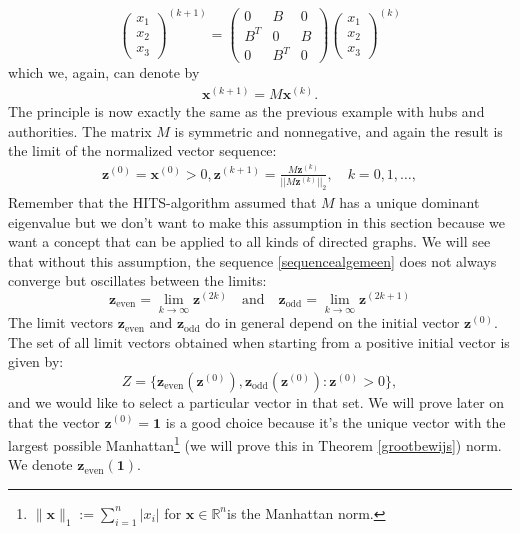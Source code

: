 \documentclass[a4paper,11pt]{report}
\newcommand{\R}{{\mathbb R}}
\begin{document}
$$\begin{pmatrix}
x_1\\
x_2\\
x_3
\end{pmatrix}^{(k+1)} = \begin{pmatrix}
0 & B & 0\\
B^T & 0 & B\\
0 & B^T & 0
\end{pmatrix}\begin{pmatrix}
x_1\\
x_2\\
x_3
\end{pmatrix}^{(k)}   $$ 
which we, again, can denote by 
\begin{eqnarray}\label{kleinecompact}
 \mathbf{x}^{(k+1)} = M\mathbf{x}^{(k)}.
  \end{eqnarray}
 The principle is now exactly the 
same as the previous example with hubs and authorities. The matrix $M$ is 
symmetric and nonnegative, and again the result is the limit of the normalized vector sequence:
\begin{eqnarray}\label{sequencealgemeen}
  \mathbf{z}^{(0)} = \mathbf{x}^{(0)} > 0, \mathbf{z}^{(k+1)} = \frac{M\mathbf{z}^{(k)}}{||M\mathbf{z}^{(k)}||_2}, \quad k = 
  0,1,\ldots,
\end{eqnarray}
Remember that the HITS-algorithm assumed that $M$ has a unique dominant 
eigenvalue but we don't want to make this assumption in this section because we 
want a concept that can be applied to all kinds of directed graphs. We will see 
that without this assumption, the sequence \ref{sequencealgemeen} does not 
always converge but oscillates between the limits:
$$\mathbf{z}_\text{even}= \lim_{k\to\infty}\mathbf{z}^{(2k)}\quad\text{and}\quad \mathbf{z}_{\text{odd}}= \lim_{k\to\infty}\mathbf{z}^{(2k+1)}$$ 
The limit vectors $\mathbf{z}_\text{even}$ and $\mathbf{z}_\text{odd}$ do in 
general depend on the initial vector $\mathbf{z}^{(0)}$. The set of all limit vectors obtained when 
starting from a positive initial vector is given by:
$$ Z = \{\mathbf{z}_\text{even}(\mathbf{z}^{(0)}), \mathbf{z}_\text{odd}(\mathbf{z}^{(0)}): \mathbf{z}^{(0)} > 
0\},$$
and we would like to select a particular vector in that set. We will prove later on that the vector $\mathbf{z}^{(0)}=\mathbf{1}$
is a good choice because it's the unique 
vector with the largest possible Manhattan\footnote{$\|\boldsymbol{x}\|_1 := \sum_{i=1}^{n} |x_i|$ for $\mathbf{x}\in\R^n$is the Manhattan norm.} (we will prove this in Theorem \ref{grootbewijs}) norm. We denote  
$\mathbf{z}_{\text{even}}(\mathbf{1})$.
\end{document}
